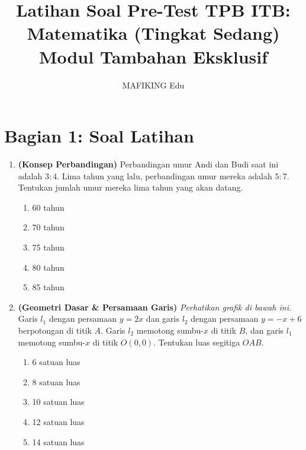 \documentclass[12pt,a4paper]{article}
\title{\textbf{Latihan Soal Pre-Test TPB ITB: Matematika (Tingkat Sedang)}\\ \large Modul Tambahan Eksklusif}
\author{MAFIKING Edu}
\date{}
\begin{document}
\maketitle

\section*{Bagian 1: Soal Latihan}

\begin{enumerate}
    \item \textbf{(Konsep Perbandingan)} Perbandingan umur Andi dan Budi saat ini adalah $3 : 4$. Lima tahun yang lalu, perbandingan umur mereka adalah $5 : 7$. Tentukan jumlah umur mereka lima tahun yang akan datang.
    \begin{enumerate}[label=\alph*.]
        \item 60 tahun
        \item 70 tahun
        \item 75 tahun
        \item 80 tahun
        \item 85 tahun
    \end{enumerate}
    
    \item \textbf{(Geometri Dasar \& Persamaan Garis)} \textit{Perhatikan grafik di bawah ini.} \\
    Garis $l_1$ dengan persamaan $y = 2x$ dan garis $l_2$ dengan persamaan $y = -x + 6$ berpotongan di titik $A$. Garis $l_2$ memotong sumbu-$x$ di titik $B$, dan garis $l_1$ memotong sumbu-$x$ di titik $O(0,0)$. Tentukan luas segitiga $OAB$.
    \begin{center}
    \end{center}
    \begin{enumerate}[label=\alph*.]
        \item 6 satuan luas
        \item 8 satuan luas
        \item 10 satuan luas
        \item 12 satuan luas
        \item 14 satuan luas
    \end{enumerate}
    

\end{enumerate}
\end{document}
